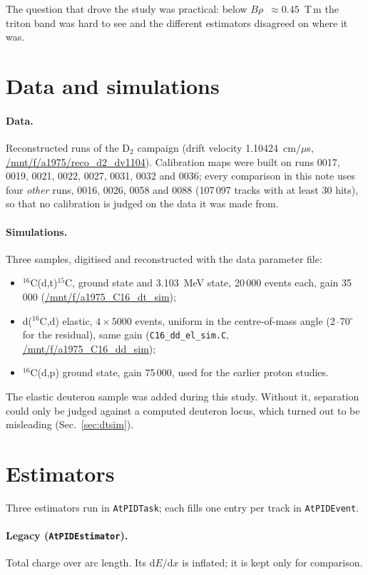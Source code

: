 \documentclass[11pt,a4paper]{article}
\newcommand{\brho}{$B\rho$}
\newcommand{\dedx}{$\mathrm{d}E/\mathrm{d}x$}
\newcommand{\code}[1]{\texttt{#1}}
\begin{document}
The question that drove the study was practical: below \brho~$\approx 0.45$~T\,m the triton band was hard to see
and the different estimators disagreed on where it was.

\section{Data and simulations}

\paragraph{Data.} Reconstructed runs of the D$_2$ campaign (drift velocity 1.10424~cm/$\mu$s,
\url{/mnt/f/a1975/reco_d2_dv1104}). Calibration maps were built on runs 0017, 0019, 0021, 0022, 0027, 0031,
0032 and 0036; every comparison in this note uses four \emph{other} runs, 0016, 0026, 0058 and 0088 (107\,097
tracks with at least 30 hits), so that no calibration is judged on the data it was made from.

\paragraph{Simulations.} Three samples, digitised and reconstructed with the data parameter file:
\begin{itemize}
\item $^{16}$C(d,t)$^{15}$C, ground state and 3.103~MeV state, 20\,000 events each, gain 35\,000
  (\url{/mnt/f/a1975_C16_dt_sim});
\item d($^{16}$C,d) elastic, $4\times5000$ events, uniform in the centre-of-mass angle (2--70$^\circ$ for the
  residual), same gain (\code{C16\_dd\_el\_sim.C}, \url{/mnt/f/a1975_C16_dd_sim});
\item $^{16}$C(d,p) ground state, gain 75\,000, used for the earlier proton studies.
\end{itemize}
The elastic deuteron sample was added during this study. Without it, separation could only be judged against a
computed deuteron locus, which turned out to be misleading (Sec.~\ref{sec:dtsim}).

\section{Estimators}

Three estimators run in \code{AtPIDTask}; each fills one entry per track in \code{AtPIDEvent}.

\paragraph{Legacy (\code{AtPIDEstimator}).} Total charge over arc length. Its \dedx{} is inflated; it is kept only
for comparison.
\end{document}
